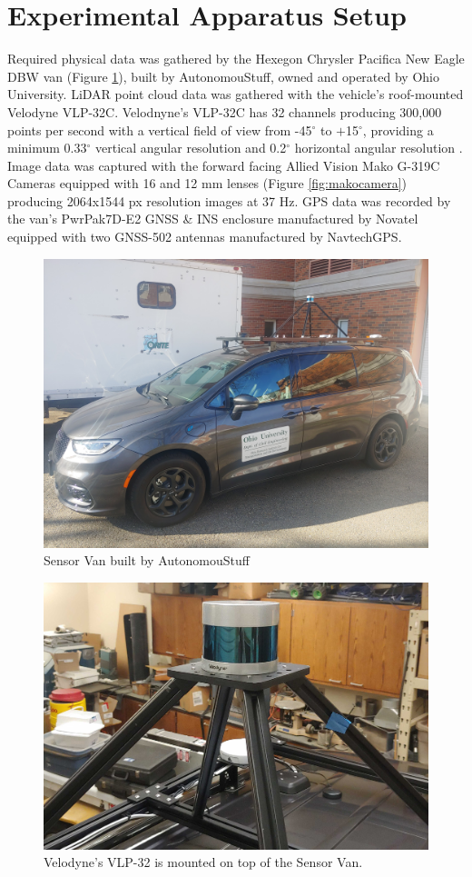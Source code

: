 \documentclass[numbered,pdftex]{ohio-etd}
\begin{document}
{	\section{Experimental Apparatus Setup}\label{sec:experimental-apparatus-setup}{
		
		{Required physical data was gathered by the Hexegon Chrysler Pacifica New Eagle DBW van (Figure \ref{fig:Experimental_Apperatus}), built by AutonomouStuff, owned and operated by Ohio University. LiDAR point cloud data was gathered with the vehicle's roof-mounted Velodyne VLP-32C. Velodnyne's VLP-32C has 32 channels producing 300,000 points per second with a vertical field of view from -45$^{\circ}$ to $+$15$^{\circ}$, providing a minimum 0.33$^{\circ}$ vertical angular resolution and 0.2$^{\circ}$ horizontal angular resolution \cite{vlp_32c}. Image data was captured with the forward facing Allied Vision Mako G-319C Cameras equipped with 16 and 12 mm lenses (Figure \ref{fig:makocamera}) producing 2064x1544 px resolution images at 37 Hz. GPS data was recorded by the van's PwrPak7D-E2 GNSS \& INS enclosure manufactured by Novatel equipped with two GNSS-502 antennas manufactured by NavtechGPS.}
		
		\begin{figure}[H]
			\centering
			\includegraphics[width=0.7\linewidth]{Defense_Images/van_on_van}
			\caption[Sensor Van]{Sensor Van built by AutonomouStuff}
			\label{fig:Experimental_Apperatus}
		\end{figure}
	
		\begin{figure}[H]
			\centering
			\includegraphics[width=0.7\linewidth]{Defense_Images/vlp_32_mount_2}
			\caption[VLP 32 on Van]{Velodyne's VLP-32 is mounted on top of the Sensor Van.}
			\label{fig:vlp32mount}
		\end{figure}
		
}}
\end{document}
